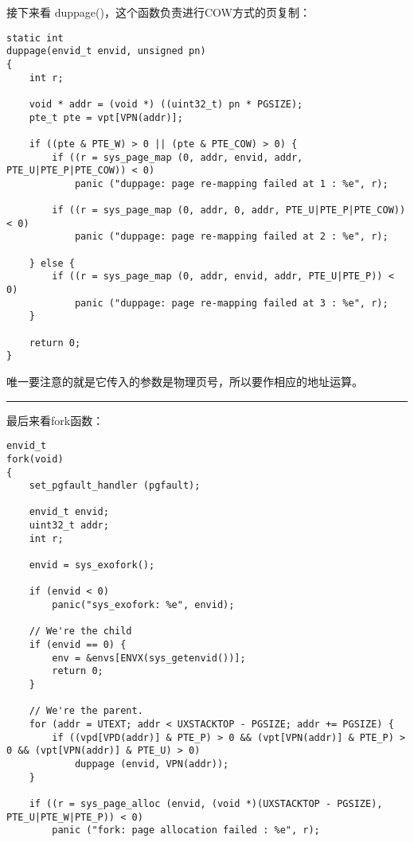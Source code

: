 \documentclass{article}
\newcommand{\funcname}[1]{{\ttfamily \small #1}}
\begin{document}
\begin{CJK*}{UTF8}{gkai}
接下来看 \funcname{duppage()}，这个函数负责进行COW方式的页复制：

\begin{lstlisting}[style=ccode, title={\scriptsize \ttfamily \bfseries lib/fork.c: duppage()}]
static int
duppage(envid_t envid, unsigned pn)
{
	int r;

    void * addr = (void *) ((uint32_t) pn * PGSIZE);
    pte_t pte = vpt[VPN(addr)];

    if ((pte & PTE_W) > 0 || (pte & PTE_COW) > 0) {
        if ((r = sys_page_map (0, addr, envid, addr, PTE_U|PTE_P|PTE_COW)) < 0)
            panic ("duppage: page re-mapping failed at 1 : %e", r);

        if ((r = sys_page_map (0, addr, 0, addr, PTE_U|PTE_P|PTE_COW)) < 0)
            panic ("duppage: page re-mapping failed at 2 : %e", r);

    } else {
        if ((r = sys_page_map (0, addr, envid, addr, PTE_U|PTE_P)) < 0)
            panic ("duppage: page re-mapping failed at 3 : %e", r);
    }
     
    return 0;
}
\end{lstlisting}

唯一要注意的就是它传入的参数是物理页号，所以要作相应的地址运算。

\vspace{2em}
\hrule
\vspace{2em}

最后来看fork函数：


\begin{lstlisting}[style=ccode, title={\scriptsize \ttfamily \bfseries lib/fork.c: fork()}]
envid_t
fork(void)
{
    set_pgfault_handler (pgfault);

    envid_t envid;
    uint32_t addr;
    int r;

    envid = sys_exofork();
	
    if (envid < 0)
        panic("sys_exofork: %e", envid);

    // We're the child
    if (envid == 0) {
        env = &envs[ENVX(sys_getenvid())];
        return 0;
    }

	// We're the parent.
    for (addr = UTEXT; addr < UXSTACKTOP - PGSIZE; addr += PGSIZE) {
        if ((vpd[VPD(addr)] & PTE_P) > 0 && (vpt[VPN(addr)] & PTE_P) > 0 && (vpt[VPN(addr)] & PTE_U) > 0)
            duppage (envid, VPN(addr));
    }

    if ((r = sys_page_alloc (envid, (void *)(UXSTACKTOP - PGSIZE), PTE_U|PTE_W|PTE_P)) < 0)
        panic ("fork: page allocation failed : %e", r);


\end{lstlisting}
\end{CJK*}
\end{document}
